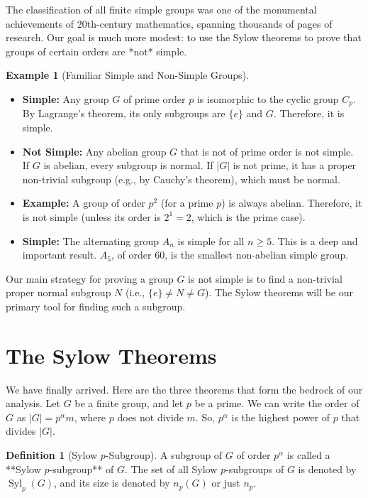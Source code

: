 \documentclass[12pt,a4paper]{article}
\theoremstyle{plain} %
\theoremstyle{definition} %
\newtheorem{definition}[theorem]{Definition}
\newtheorem{example}[theorem]{Example}
\theoremstyle{remark} %
\DeclareMathOperator{\Syl}{Syl}
\begin{document}
The classification of all finite simple groups was one of the monumental achievements of 20th-century mathematics, spanning thousands of pages of research. Our goal is much more modest: to use the Sylow theorems to prove that groups of certain orders are *not* simple.

\begin{example}[Familiar Simple and Non-Simple Groups]
\begin{itemize}
    \item \textbf{Simple:} Any group $G$ of prime order $p$ is isomorphic to the cyclic group $C_p$. By Lagrange's theorem, its only subgroups are $\{e\}$ and $G$. Therefore, it is simple.
    \item \textbf{Not Simple:} Any abelian group $G$ that is not of prime order is not simple. If $G$ is abelian, every subgroup is normal. If $|G|$ is not prime, it has a proper non-trivial subgroup (e.g., by Cauchy's theorem), which must be normal.
    \item \textbf{Example:} A group of order $p^2$ (for a prime $p$) is always abelian. Therefore, it is not simple (unless its order is $2^1=2$, which is the prime case).
    \item \textbf{Simple:} The alternating group $A_n$ is simple for all $n \ge 5$. This is a deep and important result. $A_5$, of order 60, is the smallest non-abelian simple group.
\end{itemize}
\end{example}

Our main strategy for proving a group $G$ is not simple is to find a non-trivial proper normal subgroup $N$ (i.e., $\{e\} \neq N \neq G$). The Sylow theorems will be our primary tool for finding such a subgroup.

\newpage
\section{The Sylow Theorems}

We have finally arrived. Here are the three theorems that form the bedrock of our analysis. Let $G$ be a finite group, and let $p$ be a prime. We can write the order of $G$ as $|G| = p^\alpha m$, where $p$ does not divide $m$. So, $p^\alpha$ is the highest power of $p$ that divides $|G|$.

\begin{definition}[Sylow $p$-Subgroup]
A subgroup of $G$ of order $p^\alpha$ is called a **Sylow $p$-subgroup** of $G$. The set of all Sylow $p$-subgroups of $G$ is denoted by $\Syl_p(G)$, and its size is denoted by $n_p(G)$ or just $n_p$.
\end{definition}
\end{document}
